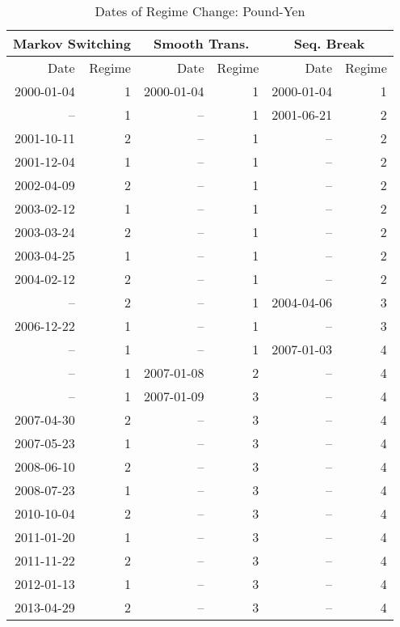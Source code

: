 \documentclass[12pt]{article}
\begin{document}
\begin{table}
	\centering
	\caption{Dates of Regime Change: Pound-Yen}
	\begin{tabular}[c]{r r | r r | r r}
		\midrule
		\multicolumn{2}{c}{Markov Switching} & \multicolumn{2}{c}{Smooth Trans.} & \multicolumn{2}{c}{Seq. Break} \\
		\midrule
		Date & Regime & Date & Regime & Date & Regime \\
		\midrule
		2000-01-04 &  1 & 2000-01-04 &  1 & 2000-01-04 &  1 \\
		        -- &  1 &         -- &  1 & 2001-06-21 &  2 \\
		2001-10-11 &  2 &         -- &  1 &         -- &  2 \\
		2001-12-04 &  1 &         -- &  1 &         -- &  2 \\
		2002-04-09 &  2 &         -- &  1 &         -- &  2 \\
		2003-02-12 &  1 &         -- &  1 &         -- &  2 \\
		2003-03-24 &  2 &         -- &  1 &         -- &  2 \\
		2003-04-25 &  1 &         -- &  1 &         -- &  2 \\
		2004-02-12 &  2 &         -- &  1 &         -- &  2 \\
		        -- &  2 &         -- &  1 & 2004-04-06 &  3 \\
		2006-12-22 &  1 &         -- &  1 &         -- &  3 \\
		        -- &  1 &         -- &  1 & 2007-01-03 &  4 \\
		        -- &  1 & 2007-01-08 &  2 &         -- &  4 \\
				-- &  1 & 2007-01-09 &  3 &         -- &  4 \\
		2007-04-30 &  2 &         -- &  3 &         -- &  4 \\
		2007-05-23 &  1 &         -- &  3 &         -- &  4 \\
		2008-06-10 &  2 &         -- &  3 &         -- &  4 \\
		2008-07-23 &  1 &         -- &  3 &         -- &  4 \\
		2010-10-04 &  2 &         -- &  3 &         -- &  4 \\
		2011-01-20 &  1 &         -- &  3 &         -- &  4 \\
		2011-11-22 &  2 &         -- &  3 &         -- &  4 \\
		2012-01-13 &  1 &         -- &  3 &         -- &  4 \\
		2013-04-29 &  2 &         -- &  3 &         -- &  4 \\

\end{tabular}
\end{table}
\end{document}
